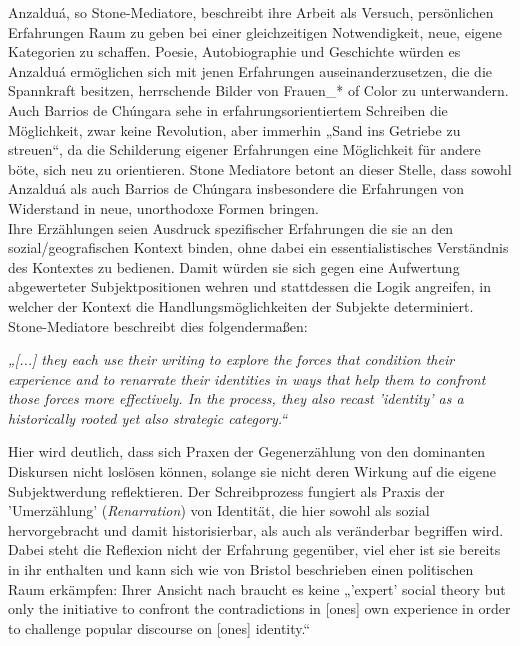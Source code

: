 Anzalduá, so Stone-Mediatore, beschreibt
ihre Arbeit als Versuch, persönlichen Erfahrungen Raum zu geben bei einer
gleichzeitigen Notwendigkeit, neue, eigene Kategorien zu schaffen. Poesie,
Autobiographie und Geschichte würden es Anzalduá ermöglichen sich mit jenen
Erfahrungen auseinanderzusetzen, die die Spannkraft besitzen, herrschende
Bilder von Frauen\_* of Color zu unterwandern.\footnotemark {} \\
Auch Barrios de Chúngara sehe in
erfahrungsorientiertem Schreiben die Möglichkeit, zwar keine Revolution, aber
immerhin „Sand ins Getriebe zu streuen“\footnotemark{}, da die Schilderung eigener
Erfahrungen eine Möglichkeit für andere böte, sich neu zu orientieren. Stone
Mediatore betont an dieser Stelle, dass sowohl Anzalduá als auch Barrios de
Chúngara insbesondere die Erfahrungen von Widerstand in neue, unorthodoxe
Formen bringen. \\
Ihre Erzählungen seien Ausdruck spezifischer Erfahrungen die
sie an den sozial/geografischen Kontext binden, ohne dabei ein
essentialistisches Verständnis des Kontextes zu bedienen. Damit würden sie sich
gegen eine Aufwertung abgewerteter Subjektpositionen wehren und stattdessen die
Logik angreifen, in welcher der Kontext die Handlungsmöglichkeiten der Subjekte
determiniert.\footnotemark {} Stone-Mediatore beschreibt dies folgendermaßen:
\begin{myenv}
    \textit{„[...] they each use their writing to explore the forces that
    condition their experience and to renarrate their identities in ways that
  help them to confront those forces more effectively. In the process, they
also recast 'identity' as a historically rooted yet also strategic
category.“\footnotemark {}}
\end{myenv}
Hier wird deutlich, dass sich Praxen der Gegenerzählung von den dominanten
Diskursen nicht loslösen können, solange sie nicht deren Wirkung auf die eigene
Subjektwerdung reflektieren. Der Schreibprozess fungiert als Praxis der
'Umerzählung' (\textit{Renarration}) von Identität, die hier sowohl als sozial
hervorgebracht und damit historisierbar, als auch als veränderbar begriffen
wird. Dabei steht die Reflexion nicht der Erfahrung gegenüber, viel eher ist sie
bereits in ihr enthalten und kann sich wie von Bristol beschrieben einen
politischen Raum erkämpfen:
Ihrer Ansicht nach  braucht es keine „'expert' social theory but only the
initiative to confront the contradictions in [ones] own experience in order to
challenge popular discourse on [ones]
identity.“\footnotemark{}\\

